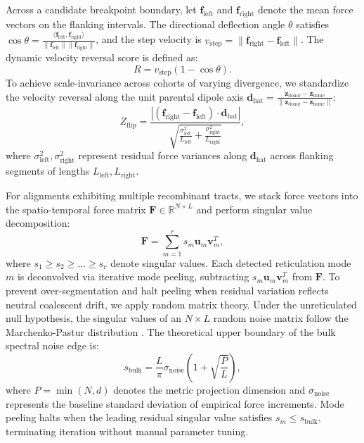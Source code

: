 Across a candidate breakpoint boundary, let $\mathbf{f}_{\text{left}}$ and $\mathbf{f}_{\text{right}}$ denote the mean force vectors on the flanking intervals.
The directional deflection angle $\theta$ satisfies $\cos \theta = \frac{\langle \mathbf{f}_{\text{left}}, \mathbf{f}_{\text{right}} \rangle}{\|\mathbf{f}_{\text{left}}\| \|\mathbf{f}_{\text{right}}\|}$, and the step velocity is $v_{\text{step}} = \|\mathbf{f}_{\text{right}} - \mathbf{f}_{\text{left}}\|$.
The dynamic velocity reversal score is defined as:
\begin{equation}
R = v_{\text{step}} (1 - \cos \theta).
\label{eq:methods_velocity_reversal}
\end{equation}
To achieve scale-invariance across cohorts of varying divergence, we standardize the velocity reversal along the unit parental dipole axis $\mathbf{d}_{\text{hat}} = \frac{\mathbf{z}_{\text{donor}} - \mathbf{z}_{\text{home}}}{\|\mathbf{z}_{\text{donor}} - \mathbf{z}_{\text{home}}\|}$:
\begin{equation}
Z_{\text{flip}} = \frac{\left| (\mathbf{f}_{\text{right}} - \mathbf{f}_{\text{left}}) \cdot \mathbf{d}_{\text{hat}} \right|}{\sqrt{\frac{\sigma_{\text{left}}^2}{L_{\text{left}}} + \frac{\sigma_{\text{right}}^2}{L_{\text{right}}}}},
\label{eq:methods_z_flip}
\end{equation}
where $\sigma_{\text{left}}^2, \sigma_{\text{right}}^2$ represent residual force variances along $\mathbf{d}_{\text{hat}}$ across flanking segments of lengths $L_{\text{left}}, L_{\text{right}}$.

For alignments exhibiting multiple recombinant tracts, we stack force vectors into the spatio-temporal force matrix $\mathbf{F} \in \mathbb{R}^{N \times L}$ and perform singular value decomposition:
\begin{equation}
\mathbf{F} = \sum_{m=1}^r s_m \mathbf{u}_m \mathbf{v}_m^T,
\label{eq:methods_svd_peeling}
\end{equation}
where $s_1 \ge s_2 \ge \dots \ge s_r$ denote singular values.
Each detected reticulation mode $m$ is deconvolved via iterative mode peeling, subtracting $s_m \mathbf{u}_m \mathbf{v}_m^T$ from $\mathbf{F}$.
To prevent over-segmentation and halt peeling when residual variation reflects neutral coalescent drift, we apply random matrix theory.
Under the unreticulated null hypothesis, the singular values of an $N \times L$ random noise matrix follow the Marchenko-Pastur distribution \citep{marchenko1967distribution}.
The theoretical upper boundary of the bulk spectral noise edge is:
\begin{equation}
s_{\text{bulk}} = \frac{L}{\pi} \sigma_{\text{noise}} \left( 1 + \sqrt{\frac{P}{L}} \right),
\label{eq:methods_marchenko_pastur}
\end{equation}
where $P = \min(N, d)$ denotes the metric projection dimension and $\sigma_{\text{noise}}$ represents the baseline standard deviation of empirical force increments.
Mode peeling halts when the leading residual singular value satisfies $s_m \le s_{\text{bulk}}$, terminating iteration without manual parameter tuning.

